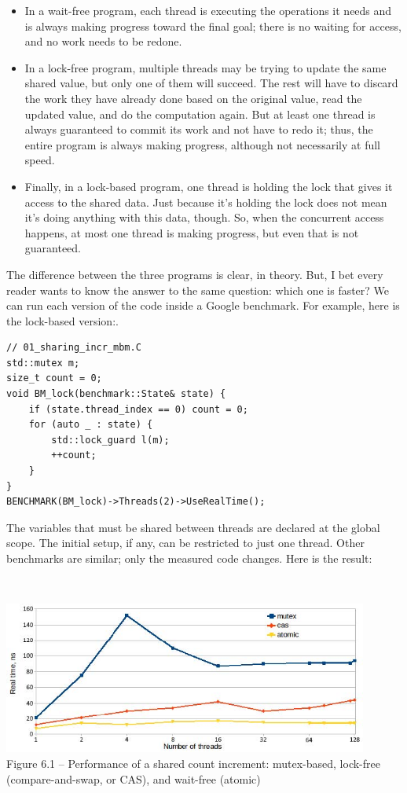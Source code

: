 \begin{itemize}
\item In a wait-free program, each thread is executing the operations it needs and is always making progress toward the final goal; there is no waiting for access, and no work needs to be redone.

\item In a lock-free program, multiple threads may be trying to update the same shared value, but only one of them will succeed. The rest will have to discard the work they have already done based on the original value, read the updated value, and do the computation again. But at least one thread is always guaranteed to commit its work and not have to redo it; thus, the entire program is always making progress, although not necessarily at full speed.

\item Finally, in a lock-based program, one thread is holding the lock that gives it access to the shared data. Just because it's holding the lock does not mean it's doing anything with this data, though. So, when the concurrent access happens, at most one thread is making progress, but even that is not guaranteed.
\end{itemize}

The difference between the three programs is clear, in theory. But, I bet every reader wants to know the answer to the same question: which one is faster? We can run each version of the code inside a Google benchmark. For example, here is the lock-based version:.

\begin{lstlisting}[style=styleCXX]
// 01_sharing_incr_mbm.C
std::mutex m;
size_t count = 0;
void BM_lock(benchmark::State& state) {
	if (state.thread_index == 0) count = 0;
	for (auto _ : state) {
		std::lock_guard l(m);
		++count;
	}
}
BENCHMARK(BM_lock)->Threads(2)->UseRealTime();
\end{lstlisting}

The variables that must be shared between threads are declared at the global scope. The initial setup, if any, can be restricted to just one thread. Other benchmarks are similar; only the measured code changes. Here is the result:

\hspace*{\fill} \\ %
\begin{center}
\includegraphics[width=0.9\textwidth]{content/2/chapter6/images/1.jpg}\\
Figure 6.1 – Performance of a shared count increment: mutex-based, lock-free (compare-and-swap, or CAS), and wait-free (atomic)
\end{center}

